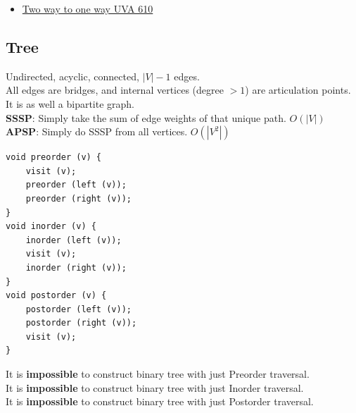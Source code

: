 \documentclass[8pt, a4paper, oneside, twocolumn]{extarticle}
\begin{document}
\begin{itemize}
\begin{verbatim}
            ArticulationPoint(v);
            
            // we increment articulation_vertex here
            if(dfs_low[v] >= dfs_num[u])
                articulation_vertex[u]++;
            if (dfs_low[v.first] > dfs_num[u])
                printf(" Edge (%d, %d) is a bridge\n", u, v.first);
                
            dfs_low[u] = min(dfs_low[u], dfs_low[v]);
        }
        else if(v != dfs_parent[u])
            dfs_low[u] = min(dfs_low[u], dfs_num[v]);
    }
}

int main() 
{
    dfs_num_counter = 0;
    dfs_num.clear(); dfs_num.resize(N, -1);
    dfs_low.clear(); dfs_low.resize(N, 0);
    dfs_parent.clear(); dfs_parent.resize(N, 0);
    
    // articulation_vertex initialized to 1 here
    articulation_vertex.clear(); articulation_vertex.resize(N, 1);

    for(int i = 0; i < N; i++)
        if (dfs_num[i] == -1)
        {
            dfs_root = i; root_children = 0;
            ArticulationPoint(i);
            
            // special case for root
            // number of connected components after the removal of root
            // is equal to how many children root has
            articulation_vertex[dfs_root] = root_children;
        }
}
    \end{verbatim}
    \item \href{https://gist.github.com/sourabh2311/01c2bdf3f7389c2b84d40db5cce506f9}{Two way to one way UVA 610}
\end{itemize}
\subsection{Tree}
Undirected, acyclic, connected, $|V| - 1$ edges.\\
All edges are bridges, and internal vertices (degree $> 1$) are articulation points.\\
It is as well a bipartite graph.\\
\textbf{SSSP}: Simply take the sum of edge weights of that unique path. $O(|V|)$\\
\textbf{APSP}: Simply do SSSP from all vertices. $O(|V^2|)$
\begin{verbatim}
void preorder (v) {
	visit (v);
	preorder (left (v));
	preorder (right (v));
}
void inorder (v) {
	inorder (left (v));
	visit (v);
	inorder (right (v));
}
void postorder (v) {
	postorder (left (v));
	postorder (right (v));
	visit (v);
}
\end{verbatim}
It is \textbf {impossible} to construct binary tree with just Preorder traversal.\\ 
It is \textbf {impossible} to construct binary tree with just Inorder traversal.\\
It is \textbf {impossible} to construct binary tree with just Postorder traversal.
\end{document}
